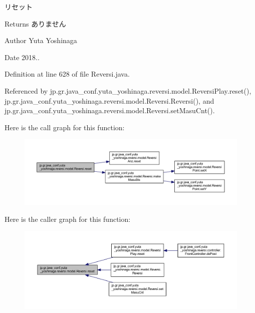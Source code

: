 リセット 

\begin{DoxyReturn}{Returns}
ありません 
\end{DoxyReturn}
\begin{DoxyAuthor}{Author}
Yuta Yoshinaga 
\end{DoxyAuthor}
\begin{DoxyDate}{Date}
2018.. 
\end{DoxyDate}


Definition at line 628 of file Reversi.\+java.



Referenced by jp.\+gr.\+java\+\_\+conf.\+yuta\+\_\+yoshinaga.\+reversi.\+model.\+Reversi\+Play.\+reset(), jp.\+gr.\+java\+\_\+conf.\+yuta\+\_\+yoshinaga.\+reversi.\+model.\+Reversi.\+Reversi(), and jp.\+gr.\+java\+\_\+conf.\+yuta\+\_\+yoshinaga.\+reversi.\+model.\+Reversi.\+set\+Masu\+Cnt().

Here is the call graph for this function\+:
\nopagebreak
\begin{figure}[H]
\begin{center}
\leavevmode
\includegraphics[width=350pt]{classjp_1_1gr_1_1java__conf_1_1yuta__yoshinaga_1_1reversi_1_1model_1_1_reversi_a497552844cbae36207f2d8c836a26b8e_cgraph}
\end{center}
\end{figure}
Here is the caller graph for this function\+:
\nopagebreak
\begin{figure}[H]
\begin{center}
\leavevmode
\includegraphics[width=350pt]{classjp_1_1gr_1_1java__conf_1_1yuta__yoshinaga_1_1reversi_1_1model_1_1_reversi_a497552844cbae36207f2d8c836a26b8e_icgraph}
\end{center}
\end{figure}
\mbox{\label{classjp_1_1gr_1_1java__conf_1_1yuta__yoshinaga_1_1reversi_1_1model_1_1_reversi_a3c63579c27513dffc555416388f8530a}} 
